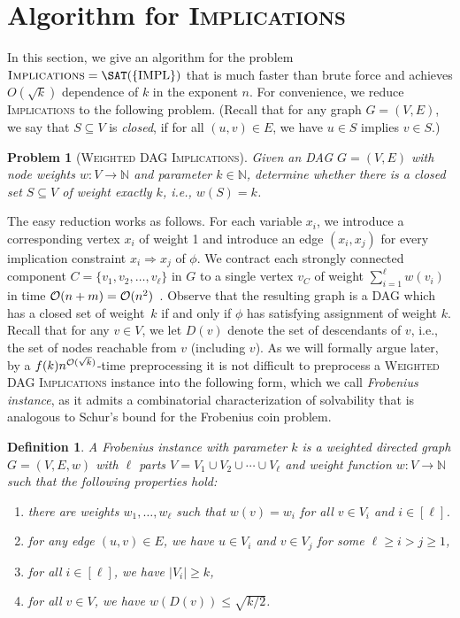 \documentclass[10pt,a4paper]{article}
\theoremstyle{plain}
\newtheorem{defn}[thm]{Definition}
\newtheorem{problem}[thm]{Problem}
\newcommand{\nats}{\mathbb{N}}
\newcommand{\Oh}{{\cal O}}
\newcommand{\Impl}{\mathrm{IMPL}}
\newcommand{\Implication}{\textsc{Implications}\xspace}
\newcommand{\wDAGImplication}{\textsc{Weighted DAG Implications}\xspace}
\begin{document}
\section{Algorithm for \Implication}
\label{sec:implalgo}
%
In this section, we give an algorithm for the problem $\Implication = \SAT(\{\Impl\})$ that is much faster than brute force and achieves $O(\sqrt{k})$ dependence of $k$ in the exponent $n$. 
For convenience, we reduce \Implication to the following problem. (Recall that for any graph $G=(V,E)$, we say that $S\subseteq V$ is \emph{closed}, if for all $(u,v)\in E$, we have $u \in S$ implies $v\in S$.)
%
\begin{problem}[\wDAGImplication]
Given an DAG $G=(V,E)$ with node weights $w: V\to \nats$ and parameter $k\in \nats$, determine whether there is a closed set $S \subseteq V$ of weight exactly $k$, i.e., $w(S) = k$.
\end{problem}
The easy reduction works as follows. For each variable $x_i$, we introduce a corresponding vertex $x_i$ of weight 1 and introduce an edge $(x_i, x_j)$ for every implication constraint $x_i \Rightarrow x_j$ of $\phi$. We contract each strongly connected component $C=\{v_1, v_2, \dots, v_\ell\}$ in $G$ to a single vertex $v_C$ of weight $\sum_{i=1}^\ell w(v_i)$ in time $\Oh(n+m)= \Oh(n^2)$~\cite{Tarjan72}. Observe that the resulting graph is a DAG which has a closed set of weight~$k$ if and only if $\phi$ has satisfying assignment of weight $k$.
%
Recall that for any $v\in V$, we let $D(v)$ denote the set of descendants of $v$, i.e., the set of nodes reachable from $v$ (including $v$).
%
As we will formally argue later, by a $f(k)n^{\Oh(\sqrt{k})}$-time preprocessing it is not difficult to preprocess a \wDAGImplication instance into the following form, which we call \emph{Frobenius instance}, as it admits a combinatorial characterization of solvability that is analogous to Schur's bound for the Frobenius coin problem.
%
\begin{defn}
A \emph{Frobenius instance with parameter $k$} is a weighted directed graph $G = (V,E, w)$ with $\ell$ parts $V = V_1 \cup V_2 \cup \cdots \cup V_\ell$ and weight function $w:V \to \nats$ such that the following properties hold: 
\begin{enumerate}[label=(P\arabic*)]
\item\label{item:structweights} there are weights $w_1, \dots, w_\ell$ such that $w(v) = w_i$ for all $v\in V_i$ and $i \in [\ell]$.
\item\label{item:structedges} for any edge $(u,v)\in E$, we have $u\in V_i$ and $v\in V_j$ for some $\ell \ge i > j \ge 1$,
\item\label{item:size} for all $i\in [\ell]$, we have $|V_i| \ge k$, 
\item\label{item:weights} for all $v\in V$, we have $w(D(v)) \le \sqrt{k/2}$.
\end{enumerate}
\end{defn}
\end{document}
